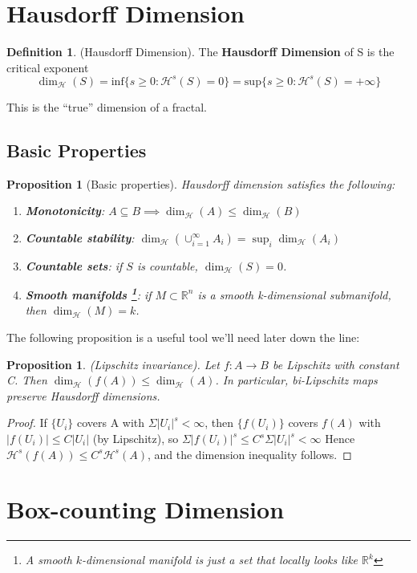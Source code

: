 \documentclass[11pt, a4paper]{article}
\theoremstyle{plain}
\newtheorem{proposition}[theorem]{Proposition}
\theoremstyle{definition}
\newtheorem{definition}[theorem]{Definition}
\theoremstyle{remark}
\newcommand{\Hm}[1]{\mathcal{H}^{#1}}   %
\newcommand{\Hd}{\dim_{\mathcal{H}}}     %
\begin{document}
\section{Hausdorff Dimension}
\begin{definition}
    (Hausdorff Dimension). The \textbf{Hausdorff Dimension} of S is the critical exponent\[
    \Hd(S) = \text{inf}\{s\geq0:\Hm{s}(S)=0\} = \text{sup}\{s\geq0:\Hm{s}(S)=+\infty\}
    \]
\end{definition}
\noindent This is the ``true'' dimension of a fractal.
\subsection{Basic Properties}
\begin{proposition}[Basic properties]
Hausdorff dimension satisfies the following:
\begin{enumerate}
    \item \textbf{Monotonicity}: $A \subseteq B \implies \Hd(A) \leq \Hd(B)$
    \item \textbf{Countable stability}: $\Hd(\cup_{i=1}^{\infty}A_i)=\sup_i\Hd(A_i)$
    \item \textbf{Countable sets}: if $S$ is countable, $\Hd(S) = 0$.
    \item \textbf{Smooth manifolds
\footnote{A smooth $k$-dimensional manifold is just a set that locally looks like $\mathbb{R}^k$}}: if $M \subset \mathbb{R}^n$ is a smooth k-dimensional submanifold, then $\Hd(M) = k$.
  \end{enumerate}
\end{proposition}
\vspace{5pt}\noindent The following proposition is a useful tool we'll need later down the line:
\begin{proposition}{(Lipschitz invariance).}
    Let $f: A\rightarrow B$ be Lipschitz with constant C. Then $\Hd(f(A))\leq\Hd(A)$. In particular, bi-Lipschitz maps preserve Hausdorff dimensions.
\end{proposition}
\begin{proof}
    If $\{U_i\}$ covers A with $\Sigma|U_i|^s<\infty$, then $\{f(U_i)\}$ covers $f(A)$ with $|f(U_i)|\leq C|U_i|$ (by Lipschitz), so $\Sigma|f(U_i)|^s\leq C^s\Sigma|U_i|^s<\infty$ Hence $\Hm{s}(f(A))\leq C^s\Hm{s}(A)$, and the dimension inequality follows.
\end{proof}
\newpage
\section{Box-counting Dimension}
\end{document}
